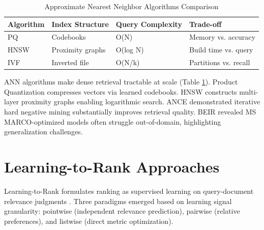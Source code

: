 \begin{table}[h]
\centering
\caption{Approximate Nearest Neighbor Algorithms Comparison}
\label{tab:ann_comparison}
\begin{tabular}{llll}
\toprule
\textbf{Algorithm} & \textbf{Index Structure} & \textbf{Query Complexity} & \textbf{Trade-off} \\
\midrule
PQ \cite{jegou2011product} & Codebooks & O(N) & Memory vs. accuracy \\
HNSW \cite{malkov2018efficient} & Proximity graphs & O(log N) & Build time vs. query \\
IVF & Inverted file & O(N/k) & Partitions vs. recall \\
\bottomrule
\end{tabular}
\end{table}

ANN algorithms make dense retrieval tractable at scale (Table \ref{tab:ann_comparison}). Product Quantization \cite{jegou2011product} compresses vectors via learned codebooks. HNSW \cite{malkov2018efficient} constructs multi-layer proximity graphs enabling logarithmic search. ANCE \cite{xiong2021approximate} demonstrated iterative hard negative mining substantially improves retrieval quality. BEIR \cite{thakur2021beir} revealed MS MARCO-optimized models often struggle out-of-domain, highlighting generalization challenges.

\section{Learning-to-Rank Approaches}

Learning-to-Rank formulates ranking as supervised learning on query-document relevance judgments \cite{liu2009learning}. Three paradigms emerged based on learning signal granularity: pointwise (independent relevance prediction), pairwise (relative preferences), and listwise (direct metric optimization).

